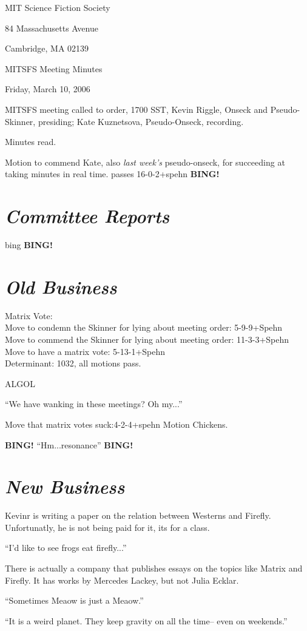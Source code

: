 \documentclass[10pt]{article}
\newcommand{\bing}{{\bf BING!} }
\newcommand{\goto}[1]{\bing \vskip 12pt \section*{{\em{#1}}}}
\begin{document}
\begin{center}

MIT Science Fiction Society

84 Massachusetts Avenue

Cambridge, MA 02139

\vspace{12pt}

MITSFS Meeting Minutes

Friday, March 10, 2006

\end{center}

\vspace{18pt}

\setlength{\parskip}{6pt}

\noindent
MITSFS meeting called to order, 1700 SST,
Kevin Riggle, Onseck and Pseudo-Skinner, presiding; Kate Kuznetsova, Pseudo-Onseck, recording.

Minutes read.

Motion to commend Kate, also \emph{last week's} pseudo-onseck, for succeeding at taking minutes in real time. passes 16-0-2+spehn
\goto{Committee Reports}

{bing}
\goto{Old Business}
Matrix Vote:\\
Move to condemn the Skinner for lying about meeting order: 5-9-9+Spehn\\
Move to commend the Skinner for lying about meeting order: 11-3-3+Spehn \\
Move to have a matrix vote: 5-13-1+Spehn\\
Determinant: 1032, all motions pass.

ALGOL

``We have wanking in these meetings? Oh my...''

Move that matrix votes suck:4-2-4+spehn
Motion Chickens.


\bing
``Hm...resonance''
\goto{New Business}

Kevinr is writing a paper on the relation between Westerns and Firefly. Unfortunatly, he is not being paid for it, its for a class.

``I'd like to see frogs eat firefly...''

There is actually a company that publishes essays on the topics like Matrix and Firefly. It has works by Mercedes Lackey, but not Julia Ecklar.

``Sometimes Meaow is just a Meaow.''

``It is a weird planet. They keep gravity on all the time-- even on weekends.''
\end{document}
